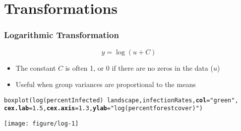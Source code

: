 \documentclass[color=usenames,dvipsnames]{beamer}\usepackage[]{graphicx}\usepackage[]{color}
\makeatletter
\newcommand{\hlnum}[1]{\textcolor[rgb]{0.69,0.494,0}{#1}}%
\newcommand{\hlstr}[1]{\textcolor[rgb]{0.749,0.012,0.012}{#1}}%
\newcommand{\hlopt}[1]{\textcolor[rgb]{0,0,0}{#1}}%
\newcommand{\hlstd}[1]{\textcolor[rgb]{0,0,0}{#1}}%
\newcommand{\hlkwc}[1]{\textcolor[rgb]{0,0,0}{\textbf{#1}}}%
\newcommand{\hlkwd}[1]{\textcolor[rgb]{0.004,0.004,0.506}{#1}}%
\newenvironment{kframe}{%
 \def\at@end@of@kframe{}%
 \ifinner\ifhmode%
  \def\at@end@of@kframe{\end{minipage}}%
  \begin{minipage}{\columnwidth}%
 \fi\fi%
 \def\FrameCommand##1{\hskip\@totalleftmargin \hskip-\fboxsep
 \colorbox{shadecolor}{##1}\hskip-\fboxsep
     \hskip-\linewidth \hskip-\@totalleftmargin \hskip\columnwidth}%
 \MakeFramed {\advance\hsize-\width
   \@totalleftmargin\z@ \linewidth\hsize
   \@setminipage}}%
 {\par\unskip\endMakeFramed%
 \at@end@of@kframe}
\newenvironment{knitrout}{}{} %
\makeatother
\begin{document}
\section{Transformations}








\begin{frame}[fragile]
  \frametitle{Logarithmic Transformation}
  \[
  y = \log(u + C)
  \]
  \begin{itemize}%
    \small %
    \item The constant $C$ is often 1, or 0 if there are no zeros in the data ($u$)
    \item Useful when group variances are proportional to the means
  \end{itemize}
\begin{knitrout}\scriptsize
{}\color{fgcolor}\begin{kframe}
\begin{alltt}
\hlkwd{boxplot}\hlstd{(}\hlkwd{log}\hlstd{(percentInfected)}\hlopt{~}\hlstd{landscape, infectionRates,} \hlkwc{col}\hlstd{=}\hlstr{"green"}\hlstd{,}
        \hlkwc{cex.lab}\hlstd{=}\hlnum{1.5}\hlstd{,} \hlkwc{cex.axis}\hlstd{=}\hlnum{1.3}\hlstd{,} \hlkwc{ylab}\hlstd{=}\hlstr{"log(percent forest cover)"}\hlstd{)}
\end{alltt}
\end{kframe}

{\centering \texttt{[image: figure/log-1]} 

}



\end{knitrout}
\end{frame}



\end{document}
